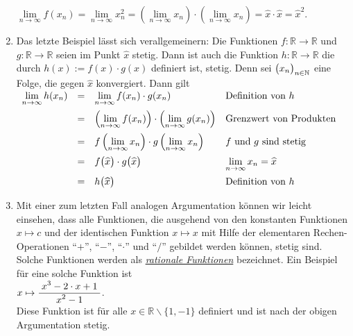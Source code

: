 \begin{enumerate}
      $\lim\limits_{n\rightarrow\infty} f(x_n) = 
       \lim\limits_{n\rightarrow\infty} x_n^2 = 
       \left(\lim\limits_{n\rightarrow\infty} x_n\right) \cdot\left(\lim\limits_{n\rightarrow\infty} x_n\right) =
       \widehat{x} \cdot \widehat{x} = \widehat{x}^2$.
\item Das letzte Beispiel l\"asst sich verallgemeinern: Die Funktionen
      $f:\mathbb{R} \rightarrow \mathbb{R}$ und $g:\mathbb{R} \rightarrow \mathbb{R}$
      seien im Punkt $\widehat{x}$ stetig.  Dann ist auch die Funktion
      $h: \mathbb{R} \rightarrow \mathbb{R}$ die durch $h(x) := f(x) \cdot g(x)$
      definiert ist, stetig.  Denn sei $\bigl(x_n\bigr)_{n\in\mathbb{N}}$ eine Folge, die gegen $\widehat{x}$
      konvergiert.  Dann gilt
      \\[0.2cm]
      \hspace*{1.3cm}      
      $
      \begin{array}[t]{lcll}
            \lim\limits_{n\rightarrow\infty} h(x_n) 
      & = & \lim\limits_{n\rightarrow\infty} f(x_n) \cdot g(x_n) & \mbox{Definition von $h$} \\[0.3cm] 
      & = & \left(\lim\limits_{n\rightarrow\infty} f(x_n)\right) \cdot \left(\lim\limits_{n\rightarrow\infty} g(x_n)\right) &
            \mbox{Grenzwert von Produkten} \\[0.3cm] 
      & = & f\left(\lim\limits_{n\rightarrow\infty} x_n\right) \cdot g\left(\lim\limits_{n\rightarrow\infty} x_n\right) &
            \mbox{$f$ und $g$ sind stetig} \\[0.3cm] 
      & = & f\bigr(\widehat{x}\bigr) \cdot g\bigr(\widehat{x}\bigr) &
            \lim\limits_{n\rightarrow\infty} x_n = \widehat{x} \\[0.3cm] 
      & = & h\bigl(\widehat{x}\bigr) & \mbox{Definition von $h$}
      \end{array}
      $
      
\item Mit einer zum letzten Fall analogen Argumentation k\"onnen wir leicht einsehen, dass alle Funktionen,
      die ausgehend von den konstanten Funktionen $x \mapsto c$ und der identischen
      Funktion $x \mapsto x$ mit Hilfe der elementaren Rechen-Operationen 
      ``$+$'', ``$-$'', ``$\cdot $'' und ``$/$'' gebildet werden k\"onnen, stetig sind.  Solche
      Funktionen werden als \href{http://de.wikipedia.org/wiki/Rationale_Funktion}{\emph{rationale Funktionen}} bezeichnet.
      Ein       Beispiel f\"ur eine solche Funktion ist 
      \\[0.2cm]
      \hspace*{1.3cm}      
      $x \mapsto \displaystyle\frac{\;\displaystyle x^3 - 2\cdot x +1\;}{\;\displaystyle x^2 -1\;}$.
      \\[0.2cm]
      Diese Funktion ist f\"ur alle $x\in\mathbb{R} \backslash \{1,-1\}$ definiert und ist
      nach der obigen Argumentation stetig.



\end{enumerate}

